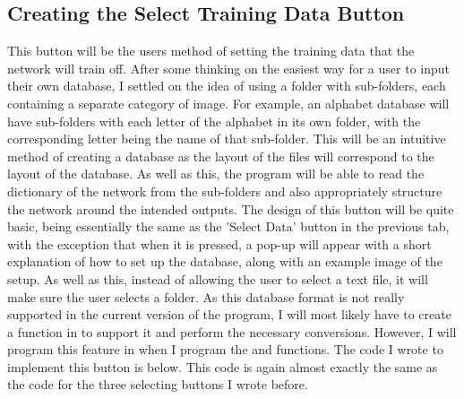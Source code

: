 \documentclass{report}
\begin{document}
\subsection{Creating the Select Training Data Button}
This button will be the users method of setting the training data that the network will train off. After some thinking on the easiest way for a user to input their own database, I settled on the idea of using a folder with sub-folders, each containing a separate category of image. For example, an alphabet database will have sub-folders with each letter of the alphabet in its own folder, with the corresponding letter being the name of that sub-folder. This will be an intuitive method of creating a database as the layout of the files will correspond to the layout of the database. As well as this, the program will be able to read the dictionary of the network from the sub-folders and also appropriately structure the network around the intended outputs.
\newline
The design of this button will be quite basic, being essentially the same as the 'Select Data' button in the previous tab, with the exception that when it is pressed, a pop-up will appear with a short explanation of how to  set up the database, along with an example image of the setup. As well as this, instead of allowing the user to select a text file, it will make sure the user selects a folder.
\newline
As this database format is not really supported in the current version of the program, I will most likely have to create a function in  to support it and perform the necessary conversions. However, I will program this feature in when I program the  and  functions.
\newline
\newline
The code I wrote to implement this button is below. This code is again almost exactly the same as the code for the three selecting buttons I wrote before.
\end{document}
